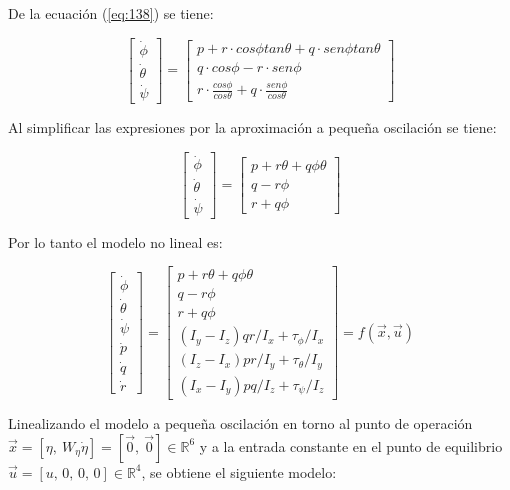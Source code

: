 \documentclass[\main/main.tex]{subfiles}
\begin{document}
De la ecuación (\ref{eq:138}) se tiene:

\[
\begin{bmatrix}\dot{\phi}\\
\dot{\theta}\\
\dot{\psi}
\end{bmatrix}=\begin{bmatrix}p+r\cdot cos\phi tan\theta+q\cdot sen\phi tan\theta\\
q\cdot cos\phi-r\cdot sen\phi\\
r\cdot\frac{cos\phi}{cos\theta}+q\cdot\frac{sen\phi}{cos\theta}
\end{bmatrix}
\]


Al simplificar las expresiones por la aproximación a pequeña oscilación
se tiene:

\[
\begin{bmatrix}\dot{\phi}\\
\dot{\theta}\\
\dot{\psi}
\end{bmatrix}=\begin{bmatrix}p+r\theta+q\phi\theta\\
q-r\phi\\
r+q\phi
\end{bmatrix}
\]


Por lo tanto el modelo no lineal es:

\[
\begin{bmatrix}\dot{\phi}\\
\dot{\theta}\\
\dot{\psi}\\
\dot{p}\\
\dot{q}\\
\dot{r}
\end{bmatrix}=\begin{bmatrix}p+r\theta+q\phi\theta\\
q-r\phi\\
r+q\phi\\
(I_{y}-I_{z})qr/I_{x}+\tau_{\phi}/I_{x}\\
(I_{z}-I_{x})pr/I_{y}+\tau_{\theta}/I_{y}\\
(I_{x}-I_{y})pq/I_{z}+\tau_{\psi}/I_{z}
\end{bmatrix}=f(\vec{x},\vec{u})
\]

Linealizando el modelo a pequeña oscilación en torno al punto de operación
$\vec{x}=[\eta,\ W_{\eta}\dot{\eta}]=[\vec{0},\ \vec{0}]\in\mathbb{R}^{6}$
y a la entrada constante en el punto de equilibrio $\vec{u}=[u,\,0,\,0,\,0]\in\mathbb{R}^{4}$,
se obtiene el siguiente modelo:
\end{document}
